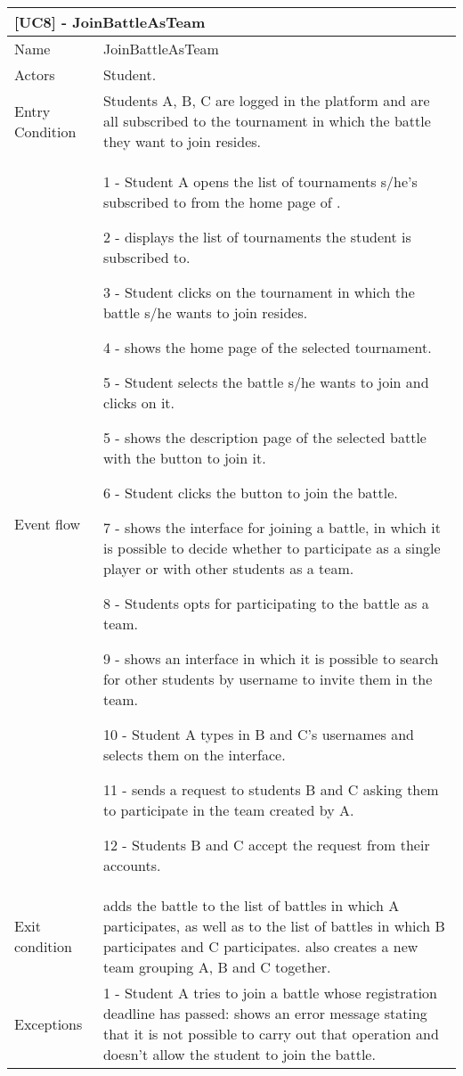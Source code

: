    
	
	\begin{longtable}{|p{3cm}p{14cm}|}
		\multicolumn{2}{l}{\textbf{[UC8] - JoinBattleAsTeam}}\\
		\hline
		Name & JoinBattleAsTeam \\
		\hline
		Actors & Student. \\
		\hline
		Entry Condition & Students A, B, C are logged in the platform and are all subscribed to the tournament in which the battle they want to join resides.\\
		\hline
		Event flow &  
		1 - Student A opens the list of tournaments s/he's subscribed to from the home page of \app.
		
		2 - \app displays the list of tournaments the student is subscribed to.
		
		3 - Student clicks on the tournament in which the battle s/he wants to join resides.
		
		4 - \app shows the home page of the selected tournament.
		
		5 - Student selects the battle s/he wants to join and clicks on it.
		
		5 - \app shows the description page of the selected battle with the button to join it.
		
		6 - Student clicks the button to join the battle.
		
		7 - \app shows the interface for joining a battle, in which it is possible to decide whether to participate as a single player or with other students as a team.
		
		8 - Students opts for participating to the battle as a team.
		
		9 - \app shows an interface in which it is possible to search for other students by username to invite them in the team.
		
		10 - Student A types in B and C's usernames and selects them on the interface.
		
		11 - \app sends a request to students B and C asking them to participate in the team created by A.
		
		12 - Students B and C accept the request from their accounts.
		
		\\
		\hline
		Exit condition & \app adds the battle to the list of battles in which A participates, as well as to the list of battles in which B participates and C participates. \app also creates a new team grouping A, B and C together.\\
		\hline
		Exceptions & 
		1 - Student A tries to join a battle whose registration deadline has passed: \app shows an error message stating that it is not possible to carry out that operation and doesn't allow the student to join the battle.
		

\end{longtable}
